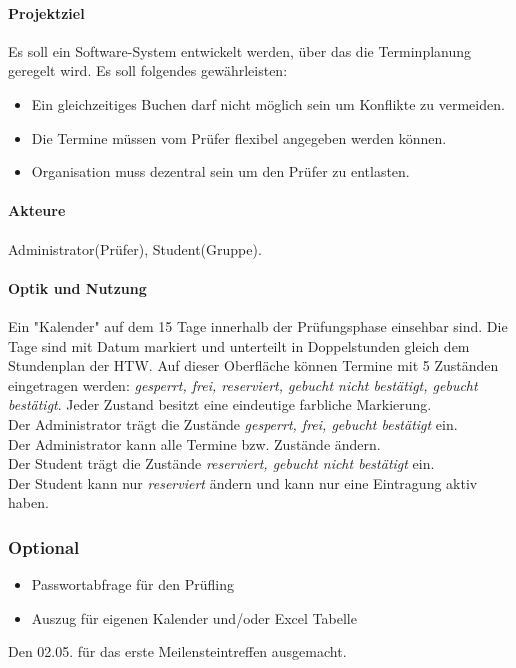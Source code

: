 \paragraph{Projektziel}
Es soll ein Software-System entwickelt werden, über das die Terminplanung geregelt wird. Es soll folgendes gewährleisten:
\begin{itemize}
\item Ein gleichzeitiges Buchen darf nicht möglich sein um Konflikte zu vermeiden.
\item Die Termine müssen vom Prüfer flexibel angegeben werden können.
\item Organisation muss dezentral sein um den Prüfer zu entlasten.
\end{itemize}

\paragraph{Akteure}
Administrator(Prüfer), Student(Gruppe).

\paragraph {Optik und Nutzung}
Ein "Kalender" auf dem 15 Tage innerhalb der Prüfungsphase einsehbar sind. Die Tage sind mit Datum markiert und unterteilt in Doppelstunden gleich dem Stundenplan der HTW. Auf dieser Oberfläche können Termine mit 5 Zuständen eingetragen werden: \textit{gesperrt, frei, reserviert, gebucht nicht bestätigt, gebucht bestätigt}. Jeder Zustand besitzt eine eindeutige farbliche Markierung.
\\Der Administrator trägt die Zustände \textit{gesperrt, frei, gebucht bestätigt} ein.
\\Der Administrator kann alle Termine bzw. Zustände ändern.
\\Der Student trägt die Zustände \textit{reserviert, gebucht nicht bestätigt} ein.
\\Der Student kann nur \textit{reserviert} ändern und kann nur eine Eintragung aktiv haben.

\subsubsection{Optional}
\begin{itemize}
	\item Passwortabfrage für den Prüfling
	\item Auszug für eigenen Kalender und/oder Excel Tabelle
\end{itemize}
Den 02.05. für das erste Meilensteintreffen ausgemacht. 



